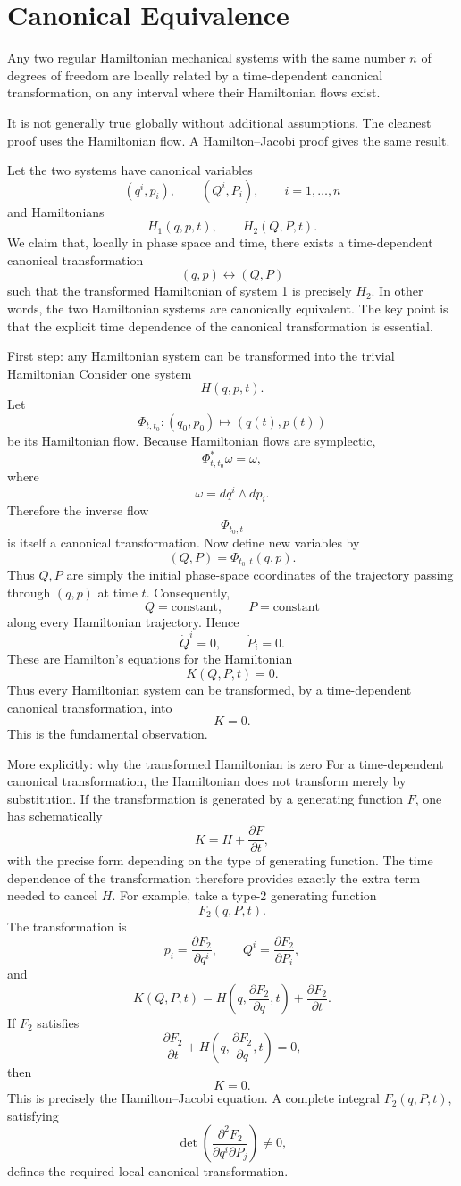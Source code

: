 \section{Canonical Equivalence}
Any two regular Hamiltonian mechanical systems with the same number \(n\) of
degrees of freedom are locally related by a time-dependent canonical
transformation, on any interval where their Hamiltonian flows exist.

It is not generally true globally without additional assumptions. The cleanest
proof uses the Hamiltonian flow. A Hamilton–Jacobi proof gives the same result.

Let the two systems have canonical variables
\[
(q^i,p_i),\qquad (Q^i,P_i),\qquad i=1,\ldots,n
\]
and Hamiltonians
\[
H_1(q,p,t),\qquad H_2(Q,P,t).
\]
We claim that, locally in phase space and time, there exists a time-dependent
canonical transformation
\[
(q,p)\longleftrightarrow(Q,P)
\]
such that the transformed Hamiltonian of system 1 is precisely \(H_2\).
In other words, the two Hamiltonian systems are canonically equivalent.
The key point is that the explicit time dependence of the canonical
transformation is essential.

First step: any Hamiltonian system can be transformed into the trivial Hamiltonian
Consider one system
\[
H(q,p,t).
\]
Let
\[
\Phi_{t,t_0}:(q_0,p_0)\mapsto(q(t),p(t))
\]
be its Hamiltonian flow.
Because Hamiltonian flows are symplectic,
\[
\Phi_{t,t_0}^{*}\omega=\omega,
\]
where
\[
\omega=dq^i\wedge dp_i.
\]
Therefore the inverse flow
\[
\Phi_{t_0,t}
\]
is itself a canonical transformation.
Now define new variables by
\[
(Q,P)=\Phi_{t_0,t}(q,p).
\]
Thus \(Q,P\) are simply the initial phase-space coordinates of the trajectory
passing through \((q,p)\) at time \(t\).
Consequently,
\[
Q=\text{constant},\qquad P=\text{constant}
\]
along every Hamiltonian trajectory.
Hence
\[
\dot Q^i=0,\qquad \dot P_i=0.
\]
These are Hamilton's equations for the Hamiltonian
\[
\boxed{K(Q,P,t)=0}.
\]
Thus every Hamiltonian system can be transformed, by a time-dependent canonical
transformation, into
\[
\boxed{K=0}.
\]
This is the fundamental observation.

 More explicitly: why the transformed Hamiltonian is zero
For a time-dependent canonical transformation, the Hamiltonian does not
transform merely by substitution.
If the transformation is generated by a generating function \(F\), one has
schematically
\[
K=H+\frac{\partial F}{\partial t},
\]
with the precise form depending on the type of generating function.
The time dependence of the transformation therefore provides exactly the extra
term needed to cancel \(H\).
For example, take a type-2 generating function
\[
F_2(q,P,t).
\]
The transformation is
\[
p_i=\frac{\partial F_2}{\partial q^i},
\qquad
Q^i=\frac{\partial F_2}{\partial P_i},
\]
and
\[
K(Q,P,t)
=
H\left(q,\frac{\partial F_2}{\partial q},t\right)
+
\frac{\partial F_2}{\partial t}.
\]
If \(F_2\) satisfies
\[
\boxed{
\frac{\partial F_2}{\partial t}
+
H\left(q,\frac{\partial F_2}{\partial q},t\right)=0,
}
\]
then
\[
\boxed{K=0}.
\]
This is precisely the Hamilton–Jacobi equation.
A complete integral \(F_2(q,P,t)\), satisfying
\[
\det\left(
\frac{\partial^2F_2}
{\partial q^i\partial P_j}
\right)\neq0,
\]
defines the required local canonical transformation.

